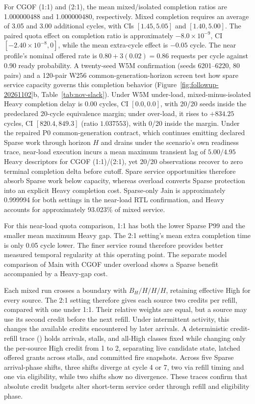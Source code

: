 For CGOF (1:1) and (2:1), the mean mixed/isolated completion ratios are 1.000000488 and 1.000000480, respectively. Mixed completion requires an average of 3.05 and 3.00 additional cycles, with CIs $[1.45,5.05]$ and $[1.40,5.00]$. The paired quota effect on completion ratio is approximately $-8.0\times10^{-9}$, CI $[-2.40\times10^{-8},0]$, while the mean extra-cycle effect is $-0.05$ cycle. The near profile's nominal offered rate is $0.80+3(0.02)=0.86$ requests per cycle against 0.90 ready probability. A twenty-seed W5M  confirmation (seeds 6201--6220, 80 pairs) and a 120-pair W256 common-generation-horizon screen test how spare service capacity governs this completion behavior (Figure~\ref{fig:followup-20261102}b, Table~\ref{tab:nov-slack}). Under W5M under-load, mixed-minus-isolated Heavy completion delay is $0.00$ cycles, CI $[0.0,0.0]$, with 20/20 seeds inside the predeclared 20-cycle equivalence margin; under over-load, it rises to $+834.25$ cycles, CI $[820.4,849.3]$ (ratio $1.037553$), with 0/20 inside the margin. Under the repaired P0 common-generation contract, which continues emitting declared Sparse work through horizon $H$ and drains under the scenario's own readiness trace, near-load execution incurs a mean maximum transient lag of $5.00/4.95$ Heavy descriptors for CGOF (1:1)/(2:1), yet 20/20 observations recover to zero terminal completion delta before cutoff. Spare service opportunities therefore absorb Sparse work below capacity, whereas overload converts Sparse protection into an explicit Heavy completion cost. Sparse-only Jain is approximately 0.999994 for both settings in the near-load RTL confirmation, and Heavy accounts for approximately 93.023\% of mixed service.

For this near-load quota comparison, 1:1 has both the lower Sparse P99 and the smaller mean maximum Heavy gap. The 2:1 setting's mean extra completion time is only 0.05 cycle lower. The finer service round therefore provides better measured temporal regularity at this operating point. The separate model comparison of Main with CGOF under overload shows a Sparse benefit accompanied by a Heavy-gap cost.

Each mixed run crosses a boundary with $B_H/H/H/H$, retaining effective High for every source. The 2:1 setting therefore gives each source two credits per refill, compared with one under 1:1. Their relative weights are equal, but a source may use its second credit before the next refill. Under intermittent activity, this changes the available credits encountered by later arrivals. A deterministic  credit-refill trace () holds arrivals, stalls, and all-High classes fixed while changing only the per-source High credit from 1 to 2, separating live candidate state, latched offered grants across stalls, and committed fire snapshots. Across five Sparse arrival-phase shifts, three shifts diverge at cycle 4 or 7, two via refill timing and one via eligibility, while two shifts show no divergence. These traces confirm that absolute credit budgets alter short-term service order through refill and eligibility phase.

